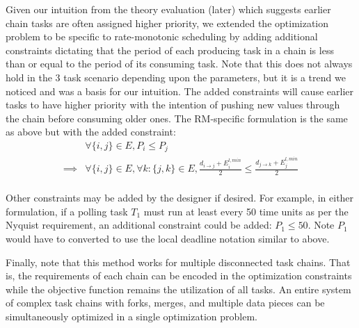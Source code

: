 Given our intuition from the theory evaluation (later) which suggests earlier chain tasks are often assigned higher priority, we extended the optimization problem to be specific to rate-monotonic scheduling by adding additional constraints dictating that the period of each producing task in a chain is less than or equal to the period of its consuming task. Note that this does not always hold in the 3 task scenario depending upon the parameters, but it is a trend we noticed and was a basis for our intuition. The added constraints will cause earlier tasks to have higher priority with the intention of pushing new values through the chain before consuming older ones. The RM-specific formulation is the same as above but with the added constraint:
\begin{align*}
	&\forall{\{i,j\} \in E}, P_{i} \le P_{j} \\
	\implies &\forall{\{i,j\} \in E}, \forall k : \{j,k\} \in E, \frac{d_{i \to j} + E^{l,min}_i}{2} \le \frac{d_{j \to k} + E^{l,min}_{j}}{2}\\
\end{align*}

Other constraints may be added by the designer if desired. For example, in either formulation, if a polling task $T_1$ must run at least every 50 time units as per the Nyquist requirement, an additional constraint could be added: $P_1 \le 50$. Note $P_1$ would have to converted to use the local deadline notation similar to above.

Finally, note that this method works for multiple disconnected task chains. That is, the requirements of each chain can be encoded in the optimization constraints while the objective function remains the utilization of all tasks. An entire system of complex task chains with forks, merges, and multiple data pieces can be simultaneously optimized in a single optimization problem.